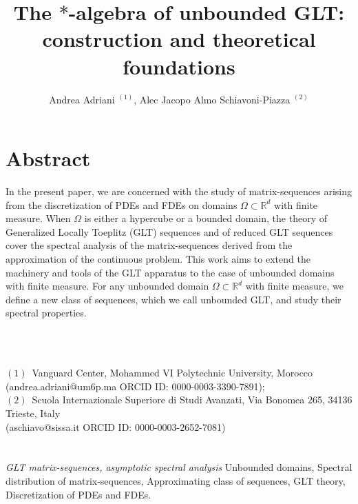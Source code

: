 \documentclass{amsart}
\newcommand{\R}{\mathbb{R}}
\providecommand{\keywords}[1]{\textit{GLT matrix-sequences, asymptotic spectral analysis} #1}
\begin{document}
\title{The $*$-algebra of unbounded GLT: construction and theoretical foundations}
\author{Andrea Adriani $^{(1)}$, Alec Jacopo Almo Schiavoni-Piazza $^{(2)}$}
\date{}


\maketitle

\section*{Abstract}

In the present paper, we are concerned with the study of matrix-sequences arising from the discretization of PDEs and FDEs on domains $\Omega \subset \R^d$ with finite measure. When $\Omega$ is either a hypercube or a bounded domain, the theory of Generalized Locally Toeplitz (GLT) sequences and of reduced GLT sequences cover the spectral analysis of the matrix-sequences derived from the approximation of the continuous problem. This work aims to extend the machinery and tools of the GLT apparatus to the case of unbounded domains with finite measure. For any unbounded domain $\Omega \subset \R^d$ with finite measure, we define a new class of sequences, which we call unbounded GLT, and study their spectral properties.


\ \\
\ \\
\medskip



\noindent
$(1)$\, Vanguard Center, Mohammed VI Polytechnic University, Morocco\\
(andrea.adriani@um6p.ma ORCID ID: 0000-0003-3390-7891);\\ %
$(2)$\, Scuola Internazionale Superiore di Studi Avanzati, Via Bonomea 265, 34136 Trieste, Italy\\ (aschiavo@sissa.it ORCID ID: 0000-0003-2652-7081)\\
\ \\
\ \\
\medskip
\noindent
\keywords{Unbounded domains, Spectral distribution of matrix-sequences, Approximating class of sequences, GLT theory, Discretization of PDEs and FDEs.}
\end{document}
